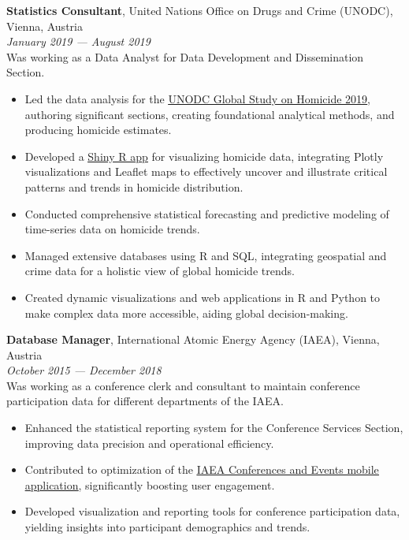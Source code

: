 \documentclass[11pt,a4paper,sans]{moderncv}
\begin{document}
\noindent \textbf{Statistics Consultant}, United Nations Office on Drugs and Crime (UNODC), Vienna, Austria \\
\textit{January 2019 — August 2019} \\
Was working as a Data Analyst for Data Development and Dissemination Section.
\begin{itemize}[noitemsep]
    \item Led the data analysis for the \href{https://www.unodc.org/unodc/en/data-and-analysis/global-study-on-homicide-2019.html}{\underline{UNODC Global Study on Homicide 2019}}, authoring significant sections, creating foundational analytical methods, and producing homicide estimates.
    \item Developed a \href{https://karavan88.shinyapps.io/homicide_data_shiny_app/}{\underline{Shiny R app}} for visualizing homicide data, integrating Plotly visualizations and Leaflet maps to effectively uncover and illustrate critical patterns and trends in homicide distribution.
    \item Conducted comprehensive statistical forecasting and predictive modeling of time-series data on homicide trends.
    \item Managed extensive databases using R and SQL, integrating geospatial and crime data for a holistic view of global homicide trends.
    \item Created dynamic visualizations and web applications in R and Python to make complex data more accessible, aiding global decision-making.
\end{itemize}

\noindent \textbf{Database Manager}, International Atomic Energy Agency (IAEA), Vienna, Austria \\
\textit{October 2015 — December 2018} \\
Was working as a conference clerk and consultant to maintain conference participation data for different departments of the IAEA.
\begin{itemize}[noitemsep]
    \item Enhanced the statistical reporting system for the Conference Services Section, improving data precision and operational efficiency.
    \item Contributed to optimization of the \href{https://apps.apple.com/us/app/iaea-conferences-and-meetings/id1033279470}{\underline{{IAEA Conferences and Events mobile application}}}, significantly boosting user engagement.
    \item Developed visualization and reporting tools for conference participation data, yielding insights into participant demographics and trends.
\end{itemize}
\end{document}
